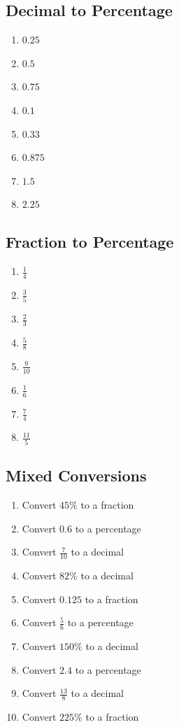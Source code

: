\documentclass{article}
\theoremstyle{mytheoremstyle}
\theoremstyle{mytheoremstyle}
\theoremstyle{myproblemstyle}
\theoremstyle{myproblemstyle}
\begin{document}
        \subsection{Decimal to Percentage}
        \begin{enumerate}
            \item $0.25$ \hfill \item $0.5$ \hfill \item $0.75$ \hfill \item $0.1$ \hfill
            \item $0.33$ \hfill \item $0.875$ \hfill \item $1.5$ \hfill \item $2.25$ \hfill
        \end{enumerate}

        \subsection{Fraction to Percentage}
        \begin{enumerate}
            \item $\frac{1}{4}$ \hfill \item $\frac{3}{5}$ \hfill \item $\frac{2}{3}$ \hfill \item $\frac{5}{8}$ \hfill
            \item $\frac{9}{10}$ \hfill \item $\frac{1}{6}$ \hfill \item $\frac{7}{4}$ \hfill \item $\frac{11}{5}$ \hfill
        \end{enumerate}

        \subsection{Mixed Conversions}
        \begin{enumerate}
            \item Convert $45\%$ to a fraction \hfill \item Convert $0.6$ to a percentage \hfill
            \item Convert $\frac{7}{10}$ to a decimal \hfill \item Convert $82\%$ to a decimal \hfill
            \item Convert $0.125$ to a fraction \hfill \item Convert $\frac{5}{6}$ to a percentage \hfill
            \item Convert $150\%$ to a decimal \hfill \item Convert $2.4$ to a percentage \hfill
            \item Convert $\frac{13}{8}$ to a decimal \hfill \item Convert $225\%$ to a fraction \hfill
        \end{enumerate}



    
\end{document}
